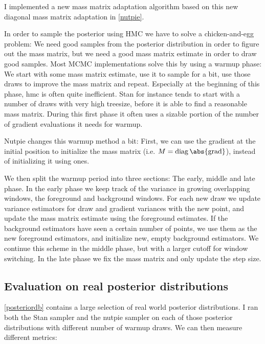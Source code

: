 \documentclass{scrartcl}
\DeclareMathOperator{\diag}{diag}
\begin{document}
I implemented a new mass matrix adaptation algorithm based on this new
diagonal mass matrix adaptation in \autoref{nutpie}.

In order to sample the posterior using HMC we have to solve a chicken-and-egg
problem: We need good samples from the posterior distribution in order to
figure out the mass matrix, but we need a good mass matrix estimate in order to
draw good samples. Most MCMC implementations solve this by using a warmup
phase: We start with some mass matrix estimate, use it to sample for a bit, use
those draws to improve the mass matrix and repeat. Especially at the beginning
of this phase, hmc is often quite inefficient. Stan for instance tends to start
with a number of draws with very high treesize, before it is able to find a
reasonable mass matrix. During this first phase it often uses a sizable portion
of the number of gradient evaluations it needs for warmup.

Nutpie changes this warmup method a bit: First, we can use the gradient at the
initial position to initialize the mass matrix (i.e. $M =
\diag{\abs{\text{grad}}}$), instead of initializing it using ones.

We then split the warmup period into three sections: The early, middle and late
phase. In the early phase we keep track of the variance in growing overlapping
windows, the foreground and background windows. For each new draw we update
variance estimators for draw and gradient variances with the new point, and
update the mass matrix estimate using the foreground estimates. If the
background estimators have seen a certain number of points, we use them as the
new foreground estimators, and initialize new, empty background estimators. We
continue this scheme in the middle phase, but with a larger cutoff for window
switching. In the late phase we fix the mass matrix and only update the step
size.

\subsection{Evaluation on real posterior distributions}

\autoref{posteriordb} contains a large selection of real world posterior
distributions. I ran both the Stan sampler and the nutpie sampler on each
of those posterior distributions with different number of warmup draws.
We can then measure different metrics:
\end{document}
